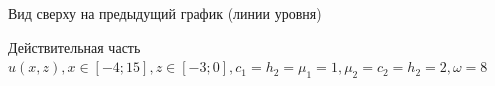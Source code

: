 \documentclass[a4paper, 12pt]{article}
\begin{document}
        \begin{figure}[h!]
            \noindent{}
            \caption{Вид сверху на предыдущий график (линии уровня)}
            \label{figCurves}
            \end{figure} 
    
\begin{figure}[h!]
\noindent{}
\caption{Действительная часть $u(x,z), x \in [-4;15], z\in [-3;0], c_1=h_2=\mu_1=1, \mu_2=c_2=h_2=2, \omega=8$}
\label{figCurves}
\end{figure}        
\end{document}
